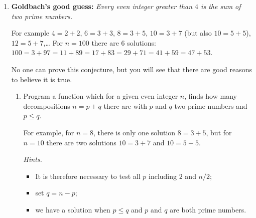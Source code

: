 \documentclass[11pt,class=report,crop=false]{standalone}
\begin{document}






\begin{activite}


\begin{enumerate}
  \item \textbf{Goldbach's good guess: } \emph{Every even integer greater than $4$ is the sum of two prime numbers.}

  For example $4 = 2+2$, $6=3+3$, $8=3+5$, $10=3+7$ (but also $10=5+5$), $12 = 5+7$,\ldots{}
  For $n=100$ there are $6$ solutions: $100=3+97=11+89=17+83=29+71=41+59=47+53$.
  
  No one can prove this conjecture, but you will see that there are good reasons to believe it is true.
  
  \begin{enumerate}
    \item Program a function  which for a given even integer $n$, finds how many decompositions $n=p+q$ there are with $p$ and $q$ two prime numbers and $p\le q$.
    
    For example, for $n=8$, there is only one solution $8=3+5$, but for $n=10$ there are two solutions $10 = 3+7$ and $10=5+5$.
 
   \emph{Hints.} 
   \begin{itemize}
     \item It is therefore necessary to test all $p$ including $2$ and $n/2$;
     \item set $q = n - p$;
     \item we have a solution when $p \le q$ and $p$ and $q$ are both prime numbers.
   \end{itemize}
   

\end{enumerate}
\end{enumerate}
\end{activite}
\end{document}
